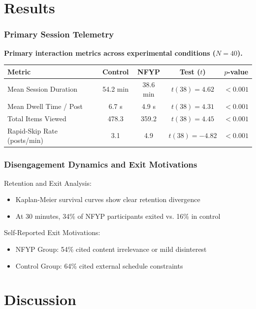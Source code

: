 \documentclass{beamer}
\begin{document}
	\section{Results}
	
	\begin{frame}
		\frametitle{Primary Session Telemetry}
		
		\begin{center}
			\footnotesize
			\textbf{Primary interaction metrics across experimental conditions ($N=40$).} \\[0.4em]
			\setlength{\tabcolsep}{4pt}
			\begin{tabular}{lcccc}
				\toprule
				Metric & Control & NFYP & Test ($t$) & $p$-value \\
				\midrule
				Mean Session Duration & 54.2 min & 38.6 min & $t(38) = 4.62$ & $< 0.001$ \\
				Mean Dwell Time / Post & 6.7 s & 4.9 s & $t(38) = 4.31$ & $< 0.001$ \\
				Total Items Viewed & 478.3 & 359.2 & $t(38) = 4.45$ & $< 0.001$ \\
				Rapid-Skip Rate (posts/min) & 3.1 & 4.9 & $t(38) = -4.82$ & $< 0.001$ \\
				\bottomrule
			\end{tabular}
		\end{center}
		
	\end{frame}
	
	\begin{frame}
		\frametitle{Disengagement Dynamics and Exit Motivations}
		Retention and Exit Analysis:
		\begin{itemize}
			\item Kaplan-Meier survival curves show clear retention divergence
			\item At 30 minutes, 34\% of NFYP participants exited vs. 16\% in control
		\end{itemize}
		
		Self-Reported Exit Motivations:
		\begin{itemize}
			\item NFYP Group: 54\% cited content irrelevance or mild disinterest
			\item Control Group: 64\% cited external schedule constraints
		\end{itemize}
	\end{frame}
	
	\section{Discussion}
	
\end{document}
